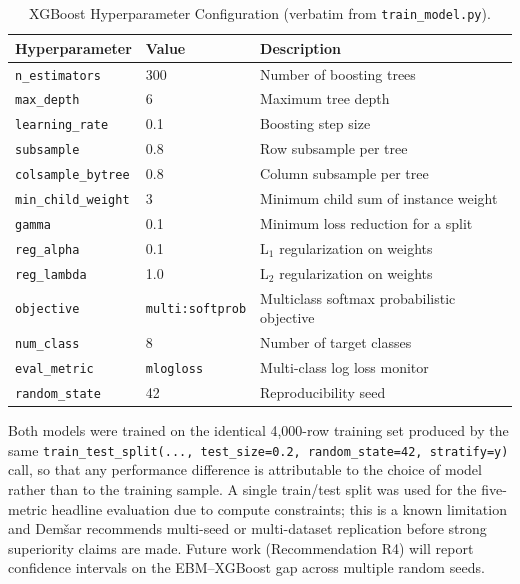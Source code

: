\documentclass[journal]{./IEEE/IEEEtran}
\begin{document}
\begin{table}[h]
    \centering
    \caption{XGBoost Hyperparameter Configuration (verbatim from \texttt{train\_model.py}).}
    \label{tab:xgb-hp}
    \footnotesize
    \begin{tabular}{|l|p{2.2cm}|p{2.7cm}|}
        \hline
        \textbf{Hyperparameter} & \textbf{Value} & \textbf{Description} \\
        \hline
        \texttt{n\_estimators} & 300 & Number of boosting trees \\
        \texttt{max\_depth} & 6 & Maximum tree depth \\
        \texttt{learning\_rate} & 0.1 & Boosting step size \\
        \texttt{subsample} & 0.8 & Row subsample per tree \\
        \texttt{colsample\_bytree} & 0.8 & Column subsample per tree \\
        \texttt{min\_child\_weight} & 3 & Minimum child sum of instance weight \\
        \texttt{gamma} & 0.1 & Minimum loss reduction for a split \\
        \texttt{reg\_alpha} & 0.1 & L$_1$ regularization on weights \\
        \texttt{reg\_lambda} & 1.0 & L$_2$ regularization on weights \\
        \texttt{objective} & \texttt{multi:softprob} & Multiclass softmax probabilistic objective \\
        \texttt{num\_class} & 8 & Number of target classes \\
        \texttt{eval\_metric} & \texttt{mlogloss} & Multi-class log loss monitor \\
        \texttt{random\_state} & 42 & Reproducibility seed \\
        \hline
    \end{tabular}
\end{table}

Both models were trained on the identical 4{,}000-row training set produced by the same \texttt{train\_test\_split(..., test\_size=0.2, random\_state=42, stratify=y)} call, so that any performance difference is attributable to the choice of model rather than to the training sample. A single train/test split was used for the five-metric headline evaluation due to compute constraints; this is a known limitation and Dem\v{s}ar \cite{ref68} recommends multi-seed or multi-dataset replication before strong superiority claims are made. Future work (Recommendation R4) will report confidence intervals on the EBM--XGBoost gap across multiple random seeds.
\end{document}
